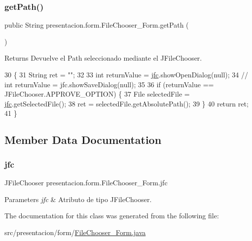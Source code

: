 \subsubsection{\texorpdfstring{get\+Path()}{getPath()}}
{\footnotesize\ttfamily public String presentacion.\+form.\+File\+Chooser\+\_\+\+Form.\+get\+Path (\begin{DoxyParamCaption}{ }\end{DoxyParamCaption})\hspace{0.3cm}{\ttfamily [inline]}}

\begin{DoxyReturn}{Returns}
Devuelve el Path seleccionado mediante el J\+File\+Chooser. 
\end{DoxyReturn}

\begin{DoxyCode}
30                             \{
31         String ret = \textcolor{stringliteral}{""};
32 
33         \textcolor{keywordtype}{int} returnValue = \hyperlink{classpresentacion_1_1form_1_1FileChooser__Form_a6fc55a912c266f0379aab09209dd858c}{jfc}.showOpenDialog(null);
34         \textcolor{comment}{// int returnValue = jfc.showSaveDialog(null);}
35 
36         \textcolor{keywordflow}{if} (returnValue == JFileChooser.APPROVE\_OPTION) \{
37             File selectedFile = \hyperlink{classpresentacion_1_1form_1_1FileChooser__Form_a6fc55a912c266f0379aab09209dd858c}{jfc}.getSelectedFile();
38             ret = selectedFile.getAbsolutePath();
39         \}
40         \textcolor{keywordflow}{return} ret;
41     \}
\end{DoxyCode}


\subsection{Member Data Documentation}
\mbox{\label{classpresentacion_1_1form_1_1FileChooser__Form_a6fc55a912c266f0379aab09209dd858c}} 
\subsubsection{\texorpdfstring{jfc}{jfc}}
{\footnotesize\ttfamily J\+File\+Chooser presentacion.\+form.\+File\+Chooser\+\_\+\+Form.\+jfc\hspace{0.3cm}{\ttfamily [private]}}


\begin{DoxyParams}{Parameters}
{\em jfc} & Atributo de tipo J\+File\+Chooser. \\
\hline
\end{DoxyParams}


The documentation for this class was generated from the following file\+:\begin{DoxyCompactItemize}
\item 
src/presentacion/form/\hyperlink{FileChooser__Form_8java}{File\+Chooser\+\_\+\+Form.\+java}\end{DoxyCompactItemize}
